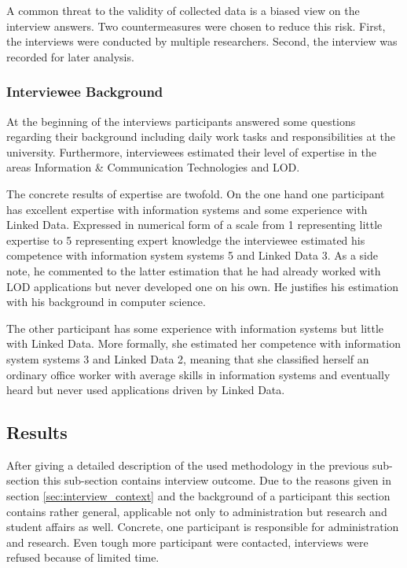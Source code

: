 \documentclass{article}
\begin{document}
A common threat to the validity of collected data is a biased view on the interview answers. Two countermeasures were chosen to reduce this risk. First, the interviews were conducted by multiple researchers. Second, the interview was recorded for later analysis. 

\subsubsection{Interviewee Background}
At the beginning of the interviews participants answered some questions regarding their background including daily work tasks and responsibilities at the university. Furthermore, interviewees estimated their level of expertise in the areas Information \& Communication Technologies and LOD.

The concrete results of expertise are twofold. 
On the one hand one participant has excellent expertise with information systems and some experience with Linked Data. Expressed in numerical form of a scale from 1 representing little expertise to 5 representing expert knowledge the interviewee estimated his competence with information system systems 5 and Linked Data 3. As a side note, he commented to the latter estimation that he had already worked with LOD applications but never developed one on his own. He justifies his estimation with his background in computer science. 

The other participant has some experience with information systems but little with Linked Data. More formally, she estimated her competence with information system systems 3 and Linked Data 2, meaning that she classified herself an ordinary office worker with average skills in information systems and eventually heard but never used applications driven by Linked Data. 

\subsection{Results}
\label{sec:results}
After giving a detailed description of the used methodology in the previous sub-section this sub-section contains interview outcome.
Due to the reasons given in section \ref{sec:interview_context} and the background of a participant this section contains rather general, applicable not only to administration but research and student affairs as well. Concrete, one participant is responsible for administration and research. Even tough more participant were contacted, interviews were refused because of limited time.
\end{document}
